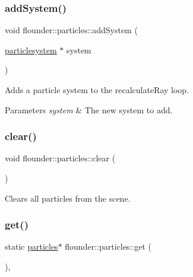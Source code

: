 \subsubsection{\texorpdfstring{add\+System()}{addSystem()}}
{\footnotesize\ttfamily void flounder\+::particles\+::add\+System (\begin{DoxyParamCaption}\item[{\hyperlink{classflounder_1_1particlesystem}{particlesystem} $\ast$}]{system }\end{DoxyParamCaption})}



Adds a particle system to the recalculate\+Ray loop. 


\begin{DoxyParams}{Parameters}
{\em system} & The new system to add. \\
\hline
\end{DoxyParams}
\mbox{\label{classflounder_1_1particles_aba5f1d3ae0abf22fbc73463075e4777f}} 
\subsubsection{\texorpdfstring{clear()}{clear()}}
{\footnotesize\ttfamily void flounder\+::particles\+::clear (\begin{DoxyParamCaption}{ }\end{DoxyParamCaption})}



Clears all particles from the scene. 

\mbox{\label{classflounder_1_1particles_aa1e98a0a6bf664a5ef5e8a637f5bc195}} 
\subsubsection{\texorpdfstring{get()}{get()}}
{\footnotesize\ttfamily static \hyperlink{classflounder_1_1particles}{particles}$\ast$ flounder\+::particles\+::get (\begin{DoxyParamCaption}{ }\end{DoxyParamCaption})\hspace{0.3cm}{\ttfamily [inline]}, {\ttfamily [static]}}



